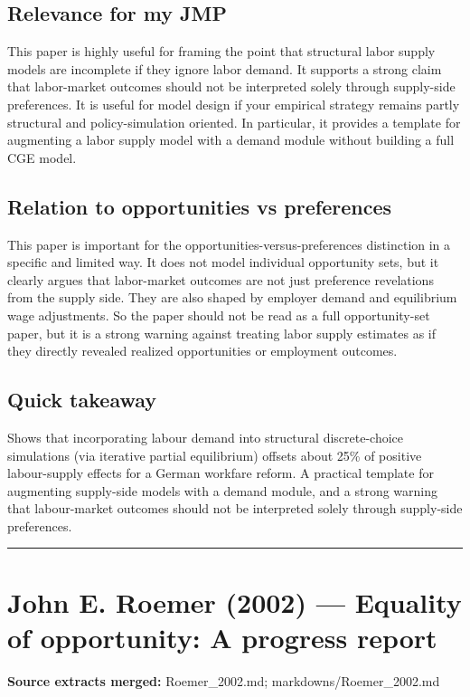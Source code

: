 \documentclass[11pt,a4paper]{article}
\begin{document}
\subsection*{Relevance for my JMP}
This paper is highly useful for framing the point that structural labor supply models are incomplete if they ignore labor demand. It supports a strong claim that labor-market outcomes should not be interpreted solely through supply-side preferences. It is useful for model design if your empirical strategy remains partly structural and policy-simulation oriented. In particular, it provides a template for augmenting a labor supply model with a demand module without building a full CGE model.

\subsection*{Relation to opportunities vs preferences}
This paper is important for the opportunities-versus-preferences distinction in a specific and limited way. It does not model individual opportunity sets, but it clearly argues that labor-market outcomes are not just preference revelations from the supply side. They are also shaped by employer demand and equilibrium wage adjustments. So the paper should not be read as a full opportunity-set paper, but it is a strong warning against treating labor supply estimates as if they directly revealed realized opportunities or employment outcomes.

\subsection*{Quick takeaway}
Shows that incorporating labour demand into structural discrete-choice simulations (via iterative partial equilibrium) offsets about 25\% of positive labour-supply effects for a German workfare reform. A practical template for augmenting supply-side models with a demand module, and a strong warning that labour-market outcomes should not be interpreted solely through supply-side preferences.


\medskip\hrule\medskip

\section*{John E. Roemer (2002) — Equality of opportunity: A progress report}

\textbf{Source extracts merged:} Roemer\_2002.md; markdowns/Roemer\_2002.md
\end{document}
